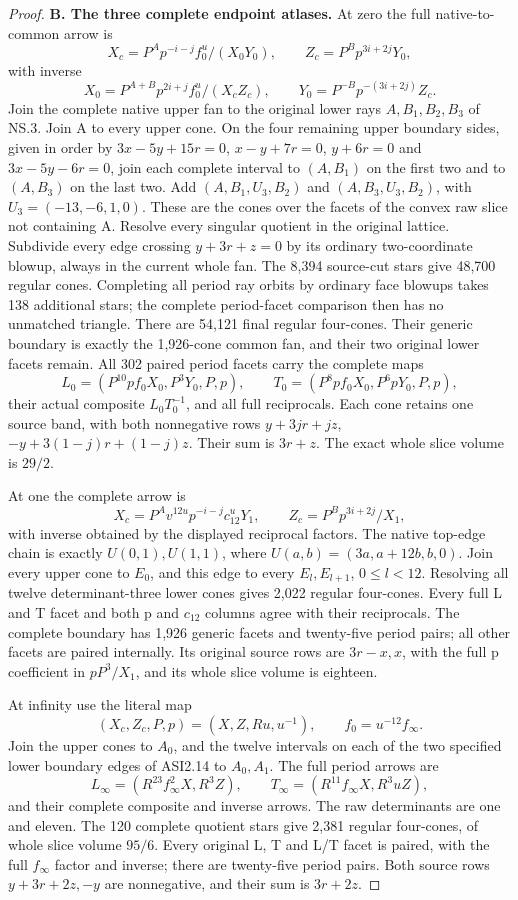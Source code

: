 \begin{proof}
\medskip\noindent\textbf{B. The three complete endpoint atlases.}
At zero the full native-to-common arrow is
\[
 X_c=P^Ap^{-i-j}f_0^u/(X_0Y_0),\qquad
 Z_c=P^Bp^{3i+2j}Y_0,
\]
with inverse
\[
 X_0=P^{A+B}p^{2i+j}f_0^u/(X_cZ_c),\qquad
 Y_0=P^{-B}p^{-(3i+2j)}Z_c.
\]
Join the complete native upper fan to the original lower rays
\(A,B_1,B_2,B_3\) of NS.3.  Join A to every upper cone.  On the four
remaining upper boundary sides, given in order by
\(3x-5y+15r=0\), \(x-y+7r=0\), \(y+6r=0\) and
\(3x-5y-6r=0\), join each complete interval to \((A,B_1)\) on the
first two and to \((A,B_3)\) on the last two.  Add
\((A,B_1,U_3,B_2)\) and \((A,B_3,U_3,B_2)\), with
\(U_3=(-13,-6,1,0)\).  These are the cones over the facets of the
convex raw slice not containing A.  Resolve every singular quotient
in the original lattice.  Subdivide every edge crossing
\(y+3r+z=0\) by its ordinary two-coordinate blowup, always in the current
whole fan.  The 8,394 source-cut stars give 48,700 regular cones.  Completing
all period ray orbits by ordinary face blowups takes 138 additional stars;
the complete period-facet comparison then has no unmatched triangle.
There are 54,121 final regular four-cones.  Their generic boundary is
exactly the 1,926-cone common fan, and their two original lower facets
remain.  All 302 paired period facets carry the complete maps
\[
L_0=(P^{10}pf_0X_0,P^3Y_0,P,p),\qquad
T_0=(P^8pf_0X_0,P^6pY_0,P,p),
\]
their actual composite \(L_0T_0^{-1}\), and all full reciprocals.
Each cone retains one source band, with both nonnegative rows
\(y+3jr+jz\), \(-y+3(1-j)r+(1-j)z\).  Their sum is \(3r+z\).
The exact whole slice volume is \(29/2\).

At one the complete arrow is
\[
 X_c=P^Av^{12u}p^{-i-j}c_{12}^uY_1,\qquad
 Z_c=P^Bp^{3i+2j}/X_1,
\]
with inverse obtained by the displayed reciprocal factors.  The native
top-edge chain is exactly
\(U(0,1),U(1,1)\), where
\(U(a,b)=(3a,a+12b,b,0)\).  Join every upper cone to \(E_0\), and this
edge to every \(E_l,E_{l+1}\), \(0\leq l<12\).  Resolving all twelve
determinant-three lower cones gives 2,022 regular four-cones.  Every full
L and T facet and both p and \(c_{12}\) columns agree with their
reciprocals.  The complete boundary has 1,926 generic facets and twenty-five
period pairs; all other facets are paired internally.  Its original source
rows are \(3r-x,x\), with the full p coefficient in \(pP^3/X_1\),
and its whole slice volume is eighteen.

At infinity use the literal map
\[
(X_c,Z_c,P,p)=(X,Z,Ru,u^{-1}),\qquad f_0=u^{-12}f_\infty.
\]
Join the upper cones to \(A_0\), and the twelve intervals on each of the
two specified lower boundary edges of ASI2.14 to \(A_0,A_1\).
The full period arrows are
\[
L_\infty=(R^{23}f_\infty^2X,R^3Z),\qquad
T_\infty=(R^{11}f_\infty X,R^3uZ),
\]
and their complete composite and inverse arrows.  The raw determinants
are one and eleven.  The 120 complete quotient stars give 2,381 regular
four-cones, of whole slice volume \(95/6\).  Every original L, T and L/T
facet is paired, with the full \(f_\infty\) factor and inverse; there are
twenty-five period pairs.  Both source rows \(y+3r+2z,-y\) are
nonnegative, and their sum is \(3r+2z\).


\end{proof}
